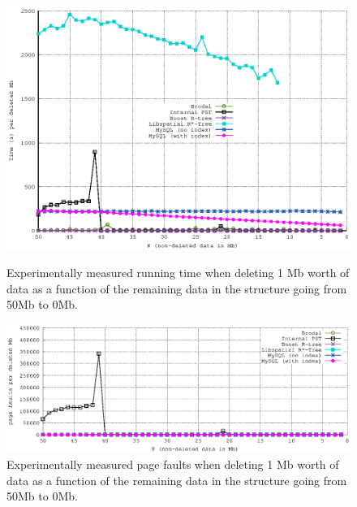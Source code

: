 \documentclass[twoside,11pt,openright]{report}
\begin{document}
\begin{figure}[htp!]
\centering
\includegraphics[width=\textwidth]{../src/experiments/delete_experiment_results/2016-05-27.10_10_14/time2}
\caption{Experimentally measured running time when deleting 1 Mb worth of data as a function of the remaining data in the structure going from 50Mb to 0Mb.}
\label{fig:delete_complexity_result}
\includegraphics[width=\textwidth]{../src/experiments/delete_experiment_results/2016-05-27.10_10_14/pfs2}
\caption{Experimentally measured page faults when deleting 1 Mb worth of data as a function of the remaining data in the structure going from 50Mb to 0Mb.}
\label{fig:delete_page_faults}
\end{figure}
\end{document}
